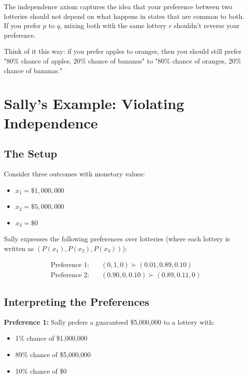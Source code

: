 \documentclass[12pt]{article}
\begin{document}
The independence axiom captures the idea that your preference between two lotteries should not depend on what happens in states that are common to both. If you prefer $p$ to $q$, mixing both with the same lottery $r$ shouldn't reverse your preference.

Think of it this way: if you prefer apples to oranges, then you should still prefer "80\% chance of apples, 20\% chance of bananas" to "80\% chance of oranges, 20\% chance of bananas."

\section{Sally's Example: Violating Independence}

\subsection{The Setup}

Consider three outcomes with monetary values:
\begin{itemize}
    \item $x_1 = \$1,000,000$
    \item $x_2 = \$5,000,000$
    \item $x_3 = \$0$
\end{itemize}

Sally expresses the following preferences over lotteries (where each lottery is written as $(P(x_1), P(x_2), P(x_3))$):

\begin{align}
\text{Preference 1:} \quad &(0, 1, 0) \succ (0.01, 0.89, 0.10) \label{eq:pref1}\\
\text{Preference 2:} \quad &(0.90, 0, 0.10) \succ (0.89, 0.11, 0) \label{eq:pref2}
\end{align}

\subsection{Interpreting the Preferences}

\textbf{Preference 1:} Sally prefers a guaranteed \$5,000,000 to a lottery with:
\begin{itemize}
    \item 1\% chance of \$1,000,000
    \item 89\% chance of \$5,000,000
    \item 10\% chance of \$0
\end{itemize}
\end{document}
